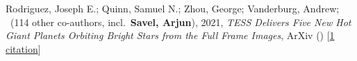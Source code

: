 \item[{\color{numcolor}\scriptsize1}] Rodriguez, Joseph E.; Quinn, Samuel N.; Zhou, George; Vanderburg, Andrew; \etal\ ({114} other co-authors, incl.\ \textbf{Savel, Arjun}), 2021, \emph{TESS Delivers Five New Hot Giant Planets Orbiting Bright Stars from the Full Frame Images}, ArXiv () [\href{https://ui.adsabs.harvard.edu/abs/2021arXiv210101726R}{1 citation}]